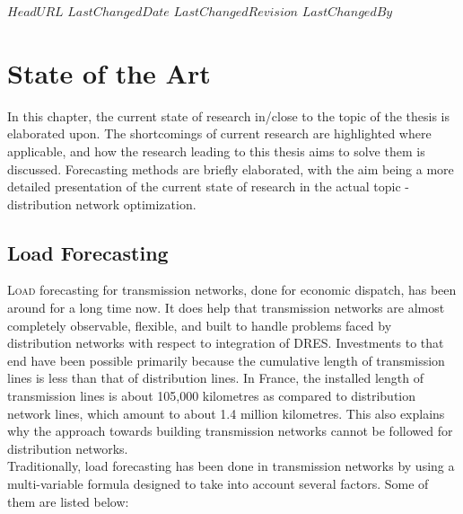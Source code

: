 \svnidlong
{$HeadURL$}
{$LastChangedDate$}
{$LastChangedRevision$}
{$LastChangedBy$}

\chapter{State of the Art}

\begin{introduction}
In this chapter, the current state of research in/close to the topic of the thesis is elaborated upon. The shortcomings of current research are highlighted where applicable, and how the research leading to this thesis aims to solve them is discussed. Forecasting methods are briefly elaborated, with the aim being a more detailed presentation of the current state of research in the actual topic - distribution network optimization.
\end{introduction}



\section{Load Forecasting}

\lettrine{L}{oad} forecasting for transmission networks, done for economic dispatch, has been around for a long time now. It does help that transmission networks are almost completely observable, flexible, and built to handle problems faced by distribution networks with respect to integration of DRES. Investments to that end have been possible primarily because the cumulative length of transmission lines is less than that of distribution lines. In France, the installed length of transmission lines is about 105,000 kilometres as compared to distribution network lines, which amount to about 1.4 million kilometres. This also explains why the approach towards building transmission networks cannot be followed for distribution networks.\\

Traditionally, load forecasting has been done in transmission networks by using a multi-variable formula designed to take into account several factors. Some of them are listed below:

